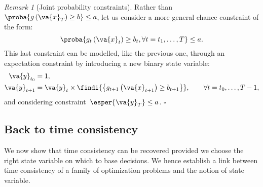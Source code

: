 \documentclass[a4paper]{amsart}
\theoremstyle{plain}
\theoremstyle{definition}
\theoremstyle{remark}
\newtheorem{remark}{Remark}
\begin{document}
\begin{remark}[Joint probability constraints] \label{rem:PrbtConstraints}
Rather than~$\proba{g\left(\va{x}_T\right) \geq b} \leq a$, let us
consider a more general chance constraint of the form:
\begin{equation*}
\proba{g_t\left(\va{x}_t\right) \geq b_t, \forall t=t_1, \dots, T}
\leq a.
\end{equation*}
This last constraint can be modelled, like the previous one,
through an expectation constraint by introducing a new binary
state variable:
\begin{align*}
\va{y}_{t_0} &= 1, \\
\va{y}_{t+1} &= \va{y}_t \times
\findi{\left\{g_{t+1}\left(\va{x}_{t+1}\right) \geq
b_{t+1}\right\}}, \qquad \forall t=t_0, \dots, T-1,
\end{align*}
and considering constraint~$\esper{\va{y}_T} \leq a$.
\hfill$\square$
\end{remark}

\subsection{Back to time consistency}

We now show that time consistency can be recovered provided we
choose the right state variable on which to base decisions. We
hence establish a link between time consistency of a family of
optimization problems and the notion of state variable.
\end{document}
